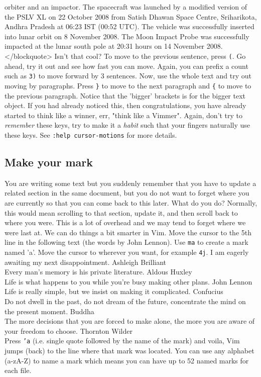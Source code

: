 orbiter and an impactor. The spacecraft was launched by a modified version of
the PSLV XL on 22 October 2008 from Satish Dhawan Space Centre, Sriharikota,
Andhra Pradesh at 06:23 IST (00:52 UTC). The vehicle was successfully inserted
into lunar orbit on 8 November 2008. The Moon Impact Probe was successfully
impacted at the lunar south pole at 20:31 hours on 14 November 2008.
</blockquote> Isn't that cool? To move to the previous sentence, press
\texttt{(}. Go ahead, try it out and see how fast you can move. Again, you can
prefix a count such as \texttt{3)} to move forward by 3 sentences. Now, use the
whole text and try out moving by paragraphs. Press \texttt{\}} to move to the
next paragraph and \texttt{\{} to move to the previous paragraph. Notice that
the 'bigger' brackets is for the bigger text object. If you had already noticed
this, then congratulations, you have already started to think like a winner,
err, "think like a Vimmer". Again, don't try to \textit{remember} these keys, try to
make it a \textit{habit} such that your fingers naturally use these keys. See
\texttt{:help cursor-motions} for more details. 

\subsection{Make your mark} 
You are writing some text but you suddenly remember that you have to update a
related section in the same document, but you do not want to forget where you
are
currently so that you can come back to this later. What do you do? Normally,
this would mean scrolling to that section, update it, and then scroll back to
where you were. This is a lot of overhead and we may tend to forget where we
were last at. We can do things a bit smarter in Vim. Move the cursor to the 5th
line in the following text (the words by John Lennon). Use \texttt{ma} to
create a mark named 'a'. Move the cursor to wherever you want, for example
\texttt{4j}. I am eagerly awaiting my next disappointment.
Ashleigh Brilliant\\ Every man's memory is his
private literature. Aldous Huxley\\ Life is what happens to you while you're busy making other plans. John Lennon 
\\ Life is really simple, but we insist on making it complicated.
Confucius\\  Do not dwell in the past, do not dream of the
future, concentrate the mind on the present moment. Buddha \\
The more decisions that you are forced to make alone, the more you are aware
of your freedom to choose. Thornton Wilder\\ Press
\texttt{'a} (i.e. single quote followed by the name of the mark) and voila, Vim
jumps (back) to the line where that mark was located. You can use any alphabet
(a-zA-Z) to name a mark which means you can have up to 52 named marks for each
file. 

